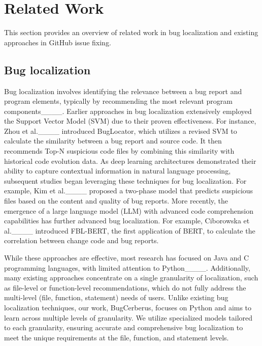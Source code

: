 \section{Related Work}
This section provides an overview of related work in bug localization and existing approaches in GitHub issue fixing.

\subsection{Bug localization}

Bug localization involves identifying the relevance between a bug report and program elements, typically by recommending the most relevant program components____. Earlier approaches in bug localization extensively employed the Support Vector Model (SVM) due to their proven effectiveness. For instance, Zhou et al.____ introduced BugLocator, which utilizes a revised SVM to calculate the similarity between a bug report and source code. It then recommends Top-N suspicious code files by combining this similarity with historical code evolution data. As deep learning architectures demonstrated their ability to capture contextual information in natural language processing, subsequent studies began leveraging these techniques for bug localization. For example, Kim et al.____ proposed a two-phase model that predicts suspicious files based on the content and quality of bug reports. More recently, the emergence of a large language model (LLM) with advanced code comprehension capabilities has further advanced bug localization. For example, Ciborowska et al.____ introduced FBL-BERT, the first application of BERT, to calculate the correlation between change code and bug reports.

While these approaches are effective, most research has focused on Java and C programming languages, with limited attention to Python____. Additionally, many existing approaches concentrate on a single granularity of localization, such as file-level or function-level recommendations, which do not fully address the multi-level (file, function, statement) needs of users. Unlike existing bug localization techniques, our work, BugCerberus, focuses on Python and aims to learn across multiple levels of granularity. We utilize specialized models tailored to each granularity, ensuring accurate and comprehensive bug localization to meet the unique requirements at the file, function, and statement levels.

